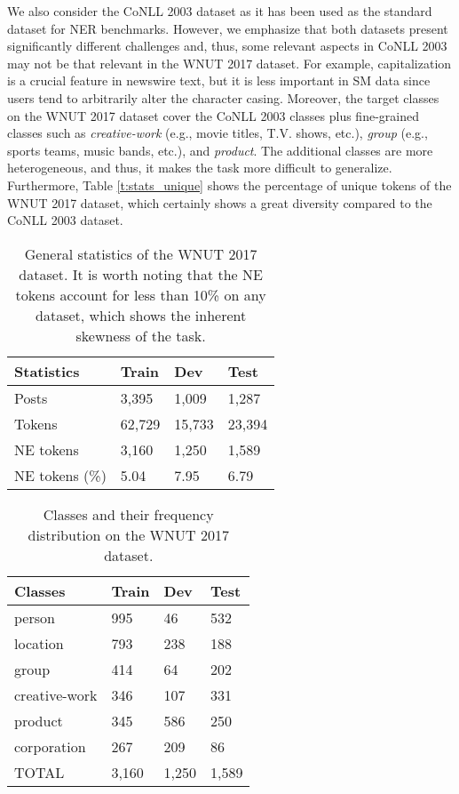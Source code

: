 \documentclass[11pt,a4paper]{article}
\begin{document}
We also consider the CoNLL 2003 dataset \citep{TjongKimSang-DeMeulder:03} as it has been used as the standard dataset for NER benchmarks. However, we emphasize that both datasets present significantly different challenges and, thus, some relevant aspects in CoNLL 2003 may not be that relevant in the WNUT 2017 dataset. For example, capitalization is a crucial feature in newswire text, but it is less important in SM data since users tend to arbitrarily alter the character casing. Moreover, the target classes on the WNUT 2017 dataset cover the CoNLL 2003 classes plus fine-grained classes such as \textit{creative-work} (e.g., movie titles, T.V. shows, etc.), \textit{group} (e.g., sports teams, music bands, etc.), and \textit{product}. The additional classes are more heterogeneous, and thus, it makes the task more difficult to generalize. Furthermore, Table \ref{t:stats_unique} shows the percentage of unique tokens of the WNUT 2017 dataset, which certainly shows a great diversity compared to the CoNLL 2003 dataset.

\begin{table}
\centering
\begin{tabular}{llll}
\hline
Statistics		& Train		& Dev		& Test \\\hline
Posts			& 3,395		& 1,009		& 1,287 \\
Tokens			& 62,729	& 15,733	& 23,394 \\
NE tokens		& 3,160		& 1,250		& 1,589 \\
NE tokens (\%)	& 5.04		& 7.95		& 6.79 \\\hline
\end{tabular}
\caption{General statistics of the WNUT 2017 dataset. It is worth noting that the NE tokens account for less than 10\% on any dataset, which shows the inherent skewness of the task. }
\label{t:wnut17_general_stats}
\end{table}

\begin{table}
\centering
\begin{tabular}{llll}
\hline
Classes			& Train	& Dev	& Test \\\hline
person			& 995	& 46	& 532 \\
location		& 793	& 238	& 188 \\
group			& 414	& 64	& 202 \\
creative-work	& 346	& 107	& 331 \\
product			& 345	& 586	& 250 \\
corporation		& 267	& 209	& 86 \\\hline
TOTAL			& 3,160	& 1,250	& 1,589 \\\hline
\end{tabular}
\caption{Classes and their frequency distribution on the WNUT 2017 dataset.}
\label{t:wnut17_dist}
\end{table}
\end{document}
